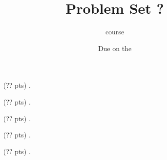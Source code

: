 

\title{Problem Set ?}
\author[Daniel Gonzalez Cedre]{course}
\date{Due on the }



  \maketitle

  \begin{enumerate}
    \item[(?? pts) \quad 1.]

    \item[(?? pts) \quad 2.]

    \item[(?? pts) \quad 3.]

    \item[(?? pts) \quad 4.]

    \item[(?? pts) \quad 5.]

  \end{enumerate}


